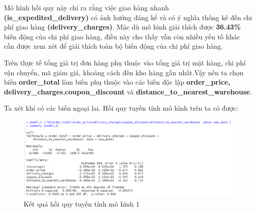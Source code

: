 Mô hình hồi quy này chỉ ra rằng việc giao hàng nhanh \textbf{(is\_expedited\_delivery)} có ảnh hưởng đáng kể và có ý nghĩa thống kê đến chi phí giao hàng \textbf{(delivery\_charges)}. Mặc dù mô hình giải thích được \textbf{36.43\%} biến động của chi phí giao hàng, điều này cho thấy vẫn còn nhiều yếu tố khác cần được xem xét để giải thích toàn bộ biến động của chi phí giao hàng.

Trên thực tế tổng giá trị đơn hàng phụ thuộc vào tổng giá trị mặt hàng, chi phí vận chuyển, mã giảm giá, khoảng cách đến kho hàng gần nhất.Vậy nên ta chọn biến \textbf{order\_total} làm biến phụ thuộc vào các biến độc lập \textbf{order\_price, delivery\_charges},\textbf{coupon\_discount} và \textbf{distance\_to\_nearest\_warehouse}.

Ta xét khi có các biến ngoại lai. Hồi quy tuyến tính mô hình trên ta có được:
\begin{figure}[ht]
  \centering
  \includegraphics[width=0.7\linewidth]{graphics/5.5.2.png}
  \caption{Kết quả hồi quy tuyến tính mô hình 1 }
\end{figure}

